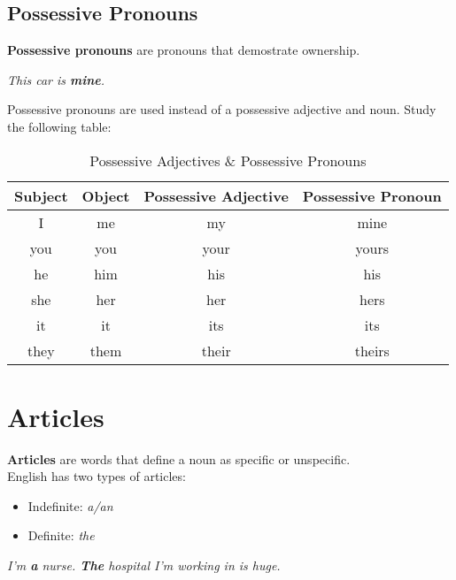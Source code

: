 \documentclass[hidelinks,10pt,a4paper]{article}
\begin{document}
\subsection{Possessive Pronouns}
\textbf{Possessive pronouns} are pronouns that demostrate ownership.
\begin{center}
\textit{This car is \textbf{mine}.}
\end{center}
\newpage
Possessive pronouns are used instead of a possessive adjective and noun. Study the following table:
\begin{table}[h]
\begin{center}
\begin{tabular}{|c|c|c|c|}
		\hline
		\textbf{Subject} & \textbf{Object} & \textbf{Possessive Adjective} & \textbf{Possessive Pronoun}\\ \hline
		I & me & my & mine \\ \hline
		you & you & your & yours \\ \hline
		he & him & his & his \\ \hline
		she & her & her & hers \\ \hline
		it & it & its & its \\ \hline
		they & them & their & theirs\\ \hline
\end{tabular}
\end{center}
\caption{Possessive Adjectives \& Possessive Pronouns} \label{tab:nouns6}
\end{table}

\section{Articles}
\textbf{Articles} are words that define a noun as specific or unspecific.\\
English has two types of articles:
\begin{itemize}
		\item Indefinite: \textit{a/an}
		\item Definite: \textit{the}
\end{itemize}
\begin{center}
\textit{I'm \textbf{a} nurse. \textbf{The} hospital I'm working in is huge.}
\end{center}
\end{document}
